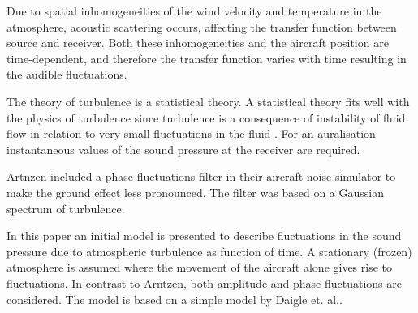 Due to spatial inhomogeneities of the wind velocity and temperature in the atmosphere, 
acoustic scattering occurs, affecting the transfer function between source and receiver. 
Both these inhomogeneities and the aircraft position are time-dependent, and therefore 
the transfer function varies with time resulting in the audible fluctuations. 

The theory of turbulence is a statistical theory. A statistical theory fits well 
with the physics of turbulence since turbulence is a consequence of instability of 
fluid flow in relation to very small fluctuations in the fluid \cite{Tatarskii1971}. For an auralisation instantaneous values of the sound pressure at the receiver are required.

Artnzen\cite{Arntzen2013a} included a phase fluctuations filter in their aircraft noise simulator to make the ground effect less pronounced.
The filter was based on a Gaussian spectrum of turbulence.

In this paper an initial model is presented to describe fluctuations in the sound pressure due to atmospheric 
turbulence as function of time. A stationary (frozen) atmosphere is assumed where the 
movement of the aircraft alone gives rise to fluctuations.
In contrast to Arntzen\cite{Arntzen2013a}, both amplitude and phase fluctuations are considered. The model is based on a simple model by Daigle et. al.\cite{Daigle1983}.


